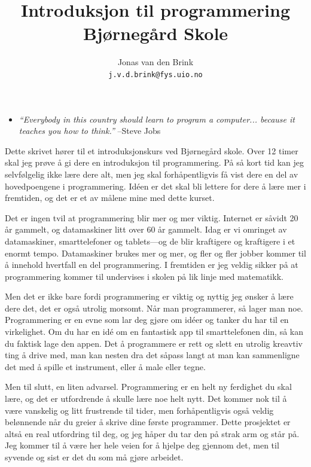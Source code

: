 \documentclass[a4paper, 11pt, notitlepage]{article}
\author{Jonas van den Brink \\[-0.2cm] \texttt{j.v.d.brink@fys.uio.no}}
\title{Introduksjon til programmering \\ Bjørnegård Skole}
\begin{document}
\maketitle

\thispagestyle{empty}
\vspace{1.8cm}

\begin{itemize}
	\item[] \emph{``Everybody in this country should learn to program a computer... because it teaches you how to think.''} --Steve Jobs
\end{itemize}

\vspace{0.8cm}

Dette skrivet hører til et introduksjonskurs ved Bjørnegård skole. Over 12 timer skal jeg prøve å gi dere en introduksjon til programmering. På så kort tid kan jeg selvfølgelig ikke lære dere alt, men jeg skal forhåpentligvis få vist dere en del av hovedpoengene i programmering. Idéen er det skal bli lettere for dere å lære mer i fremtiden, og det er et av målene mine med dette kurset.

Det er ingen tvil at programmering blir mer og mer viktig. Internet er såvidt 20 år gammelt, og datamaskiner litt over 60 år gammelt. Idag er vi omringet av datamaskiner, smarttelefoner og tablets---og de blir kraftigere og kraftigere i et enormt tempo. Datamaskiner brukes mer og mer, og fler og fler jobber kommer til å innehold hvertfall en del programmering. I fremtiden er jeg veldig sikker på at programmering kommer til undervises i skolen på lik linje med matematikk.

Men det er ikke bare fordi programmering er viktig og nyttig jeg ønsker å lære dere det, det er også utrolig morsomt. Når man programmerer, så lager man noe. Programmering er en evne som lar deg gjøre om idéer og tanker du har til en virkelighet. Om du har en idé om en fantastisk app til smarttelefonen din, så kan du faktisk lage den appen. Det å programmere er rett og slett en utrolig kreavtiv ting å drive med, man kan nesten dra det såpass langt at man kan sammenligne det med å spille et instrument, eller å male eller tegne.

Men til slutt, en liten advarsel. Programmering er en helt ny ferdighet du skal lære, og det er utfordrende å skulle lære noe helt nytt. Det kommer nok til å være vanskelig og litt frustrende til tider, men forhåpentligvis også veldig belønnende når du greier å skrive dine første programmer. Dette prosjektet er altså en real utfordring til deg, og jeg håper du tar den på strak arm og står på. Jeg kommer til å være her hele veien for å hjelpe deg gjennom det, men til syvende og sist er det du som må gjøre arbeidet. 
\end{document}
